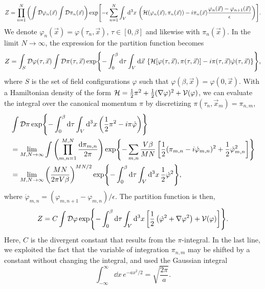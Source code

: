 \begin{align*}
    Z = 
    \prod_{n=1}^N  
    \left(
        \int \mathcal{D} \varphi_n (\vec x) \int \mathcal{D} \pi_n(\vec x)
    \right)
    \exp[-\epsilon \sum_{n=1}^N \int_V \dd^3x \,
    \left(
        \mathcal{H}(\varphi_n(\vec x), \pi_n(\vec x)) - i \pi_n(\vec x) \frac{\varphi_n(\vec x) - \varphi_{n+1}(\vec x)}{\epsilon}
    \right)
    ].
\end{align*}
We denote $\varphi_n(\vec x) = \varphi(\tau_n, \vec x) $, $\tau \in [0, \beta]$ and likewise with $\pi_n(\vec x)$. 
In the limit $N \rightarrow \infty$, the expression for the partition function becomes
\begin{align}
    \label{Thermal partition function}
    Z = \int_S \mathcal{D} \varphi(\tau, \vec x)
    \int \mathcal{D} \pi(\tau, \vec x)
    \exp{
        - \int_0^\beta \dd \tau \int_V \dd \vec x \, 
        \left\{
            \mathcal{H}[\varphi(\tau, \vec x), \pi(\tau, \vec x)]
            - i \pi(\tau, \vec x) \dot \varphi(\tau, \vec x)
        \right\}
        },
\end{align}
where $S$ is the set of field configurations $\varphi$ such that  $\varphi(\beta, \vec x) = \varphi(0, \vec x)$.
With a Hamiltonian density of the form $\mathcal{H} = \frac{1}{2} \pi^2 + \frac{1}{2} (\nabla \varphi)^2 + \mathcal{V}(\varphi)$, we can evaluate the integral over the canonical momentum $\pi$ by discretizing $\pi(\tau_n, \vec x_m) = \pi_{n,m}$,
\begin{align*}
    & \int \mathcal{D} \pi \exp{-  \int_0^\beta\dd \tau \int_V \dd^3x 
    \left(
        \frac{1}{2} \pi^2 - i \pi \dot \varphi 
    \right)} \\
    & = \lim_{M,N \rightarrow \infty} \int \left(\prod_{m, n = 1}^{M, N} \frac{\dd \pi_{m, n}}{2 \pi}\right)
    \exp{
        - \sum_{m, n} \frac{V\beta}{MN}
        \left[
            \frac{1}{2}  (\pi_{m, n} - i \dot \varphi_{m, n})^2
            + \frac{1}{2} \dot \varphi_{m, n}^2
        \right]
    } \\
    & = \lim_{M,N \rightarrow \infty} \left( \frac{M N }{2 \pi V \beta} \right)^{MN/2}
    \exp{- \int_0^\beta\dd \tau \int_V \dd^3x \, \frac{1}{2}\dot \varphi^2},
\end{align*}
where $\dot \varphi_{m, n} = (\varphi_{m, n+1} - \varphi_{m, n})/\epsilon$.
The partition function is then, 
\begin{equation}
    Z = C \int \mathcal{D} \varphi
    \exp{
        - \int_0^\beta \dd \tau \int_V \dd^3 x
        \left[
            \frac{1}{2} \left(\dot \varphi^2 + \nabla \varphi^2\right) 
            + \mathcal{V}(\varphi)
        \right]
    }.
\end{equation}
Here, $C$ is the divergent constant that results from the $\pi$-integral.
In the last line, we exploited the fact that the variable of integration $\pi_{n,m}$ may be shifted by a constant without changing the integral, and used the Gaussian integral
\begin{equation*}
    \int_{-\infty}^{\infty} \dd x \, e^{-a x^2/2} = \sqrt{\frac{2 \pi}{a}}.
\end{equation*}


